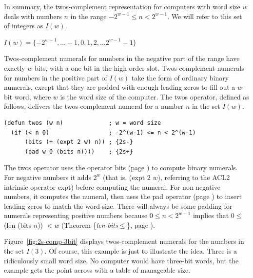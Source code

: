In summary, the twos-complement representation for computers with
word size $w$ deals with numbers $n$ in the range
$-2^{w-1} \leq n < 2^{w-1}$.
We will refer to this set of integers as $I(w)$.
\label{def-Iw}
\begin{center}
$I(w) = \{-2^{w-1}, \dots -1, 0, 1, 2, \dots 2^{w-1}-1\}$
\end{center}

Twos-complement numerals for numbers in the negative part of the range
have exactly $w$ bits, with a one-bit in the high-order slot.
Twos-complement numerals for numbers in the positive part of $I(w)$
take the form of ordinary binary numerals, except that
they are padded with enough leading zeros
to fill out a $w$-bit word, where $w$ is the word size of the computer.
The \textsf{twos} operator, defined as follows, delivers the twos-complement numeral
for a number $n$ in the set $I(w)$.

\label{twos-defun}
\begin{Verbatim}
(defun twos (w n)             ; w = word size
  (if (< n 0)                 ; -2^(w-1) <= n < 2^(w-1)
      (bits (+ (expt 2 w) n)) ; {2s-}
      (pad w 0 (bits n))))    ; {2s+}
\end{Verbatim}

The \textsf{twos} operator uses the operator \textsf{bits} (page \pageref{bits-defun})
to compute binary numerals.
For negative numbers it adds $2^w$
(that is, \textsf{(expt $2$ $w$)}, referring to the ACL2 intrinsic operator \textsf{expt})
before computing the numeral.
For non-negative numbers, it computes the numeral,
then uses the \textsf{pad} operator (page \pageref{pad-defun})
to insert leading zeros to match the word-size.
There will always be some padding for numerals representing
positive numbers because
$0 \le n < 2^{w-1}$ implies that
$0 \le $(len (bits $n$)) $< w$
(Theorem \{\emph{len-bits}$\le$\}, page \pageref{len-bitsLE}).

Figure~\ref{fig:2s-comp-3bit} displays
twos-complement numerals for the numbers in the set $I(3)$.
Of course, this example is just to illustrate the idea.
Three is a ridiculously small word size.
No computer would have three-bit words,
but the example gets the point across with a table of manageable size.

